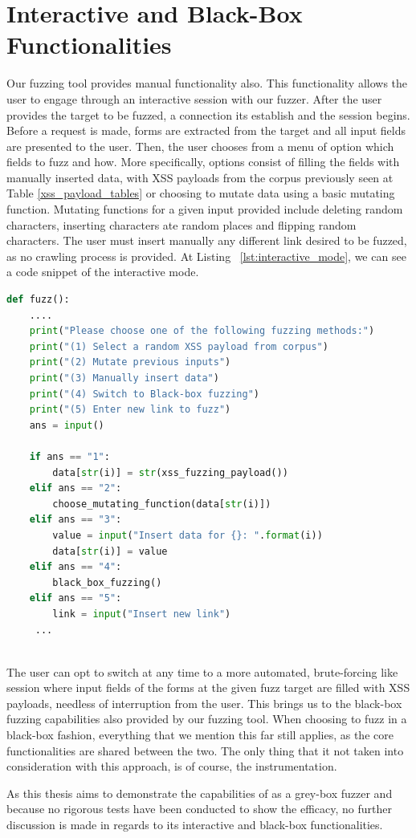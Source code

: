 \section{Interactive and Black-Box Functionalities}
Our fuzzing tool provides manual functionality also. This functionality allows the user to engage through an interactive session with our fuzzer. After the user provides the target to be fuzzed, a connection its establish and the session begins. Before a request is made, forms are extracted from the target and all input fields are presented to the user. Then, the user chooses from a menu of option which fields to fuzz and how. More specifically, options consist of filling the fields with manually inserted data, with XSS payloads from the corpus previously seen at Table \ref{xss_payload_tables} or choosing to mutate data using a basic mutating function. Mutating functions for a given input provided include deleting random characters, inserting characters ate random places and flipping random characters. The user must insert manually any different link desired to be fuzzed, as no crawling process is provided. At Listing ~\ref{lst:interactive_mode}, we can see a code snippet of the interactive mode. 

\begin{lstlisting}[showstringspaces=false, frame=single, language=Python, caption={Options menu and their processing during interactive mode fuzzing}, numberstyle=\color{gray}, numbersep=5pt, label={lst:interactive_mode}]
def fuzz():
	....
	print("Please choose one of the following fuzzing methods:")
	print("(1) Select a random XSS payload from corpus")
	print("(2) Mutate previous inputs")
	print("(3) Manually insert data")
	print("(4) Switch to Black-box fuzzing")
	print("(5) Enter new link to fuzz")
	ans = input()
     	    					
    if ans == "1":
		data[str(i)] = str(xss_fuzzing_payload())
	elif ans == "2":
		choose_mutating_function(data[str(i)])
	elif ans == "3":
		value = input("Insert data for {}: ".format(i))
		data[str(i)] = value
	elif ans == "4":
		black_box_fuzzing()
	elif ans == "5":
		link = input("Insert new link")
     ...
     
\end{lstlisting}

The user can opt to switch at any time to a more automated, brute-forcing like session where input fields of the forms at the given fuzz target are filled with XSS payloads, needless of interruption from the user. This brings us to the black-box fuzzing capabilities also provided by our fuzzing tool. When choosing to fuzz in a black-box fashion, everything that we mention this far still applies, as the core functionalities are shared between the two. The only thing that it not taken into consideration with this approach, is of course, the instrumentation.

As this thesis aims to demonstrate the capabilities of \pname{} as a grey-box fuzzer and because no rigorous tests have been conducted to show the efficacy, no further discussion is made in regards to its interactive and black-box functionalities.